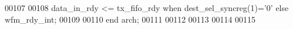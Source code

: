 \begin{DoxyCode}
00107 
00108 \textcolor{vhdlchar}{data_in_rdy}     \textcolor{vhdlchar}{<=} \textcolor{vhdlchar}{tx_fifo_rdy} \textcolor{keywordflow}{when} \textcolor{vhdlchar}{dest_sel_syncreg}\textcolor{vhdlchar}{(}\textcolor{vhdllogic}{}\textcolor{vhdllogic}{1}\textcolor{vhdlchar}{)}\textcolor{vhdlchar}{=}\textcolor{vhdlchar}{'}\textcolor{vhdllogic}{}\textcolor{vhdllogic}{0}\textcolor{vhdlchar}{'} \textcolor{keywordflow}{else} \textcolor{vhdlchar}{wfm_rdy_int};
00109   
00110 \textcolor{keywordflow}{end} \textcolor{vhdlchar}{arch};
00111 
00112 
00113 
00114 
00115 
\end{DoxyCode}
